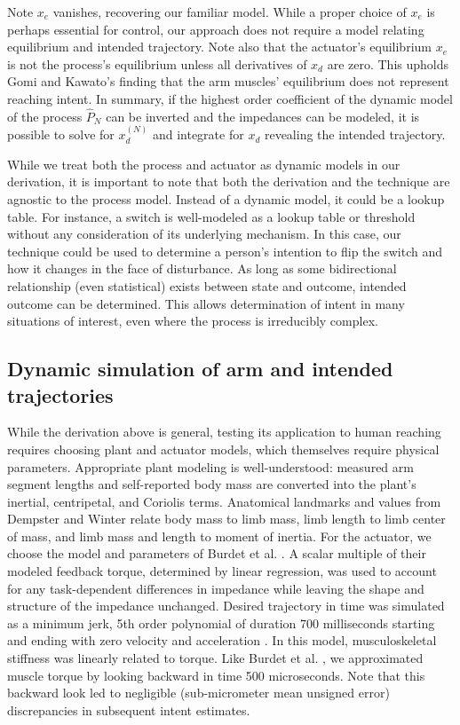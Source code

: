 \documentclass[10pt]{article}
\begin{document}
Note $x_e$ vanishes, recovering our familiar model. While a proper choice of $x_e$ is perhaps essential for control, our approach does not require a model relating equilibrium and intended trajectory. Note also that the actuator's equilibrium $x_e$ is not the process's equilibrium unless all derivatives of $x_d$ are zero. This upholds Gomi and Kawato's finding that the arm muscles' equilibrium does not represent reaching intent\cite{gomi1997human}. In summary, if the highest order coefficient of the dynamic model of the process $\hat{P}_N$ can be inverted and the impedances can be modeled, it is possible to solve for $x_d^{(N)}$ and integrate for $x_d$ revealing the intended trajectory.

While we treat both the process and actuator as dynamic models in our derivation, it is important to note that both the derivation and the technique are agnostic to the process model. Instead of a dynamic model, it could be a lookup table. For instance, a switch is well-modeled as a lookup table or threshold without any consideration of its underlying mechanism. In this case, our technique could be used to determine a person's intention to flip the switch and how it changes in the face of disturbance. As long as some bidirectional relationship (even statistical) exists between state and outcome, intended outcome can be determined. This allows determination of intent in many situations of interest, even where the process is irreducibly complex.

\subsection*{Dynamic simulation of arm and intended trajectories}
While the derivation above is general, testing its application to human reaching requires choosing plant and actuator models, which themselves require physical parameters. Appropriate plant modeling is well-understood: measured arm segment lengths and self-reported body mass are converted into the plant's inertial, centripetal, and Coriolis terms. Anatomical landmarks and values from Dempster \cite{dempster1955space} and Winter \cite{winter2009biomechanics} relate body mass to limb mass, limb length to limb center of mass, and limb mass and length to moment of inertia. For the actuator, we choose the model and parameters of Burdet et al. \cite{burdet2006stability}. A scalar multiple of their modeled feedback torque, determined by linear regression, was used to account for any task-dependent differences in impedance \cite{franklin2003adaptation} while leaving the shape and structure of the impedance unchanged. Desired trajectory in time was simulated as a minimum jerk, 5th order polynomial of duration 700 milliseconds starting and ending with zero velocity and acceleration \cite{flash1985coordination}.  In this  model, musculoskeletal stiffness was linearly related to torque. Like Burdet et al. \cite{burdet2006stability}, we approximated muscle torque by looking backward in time 500 microseconds. Note that this backward look led to negligible (sub-micrometer mean unsigned error) discrepancies in subsequent intent estimates. 
\end{document}
